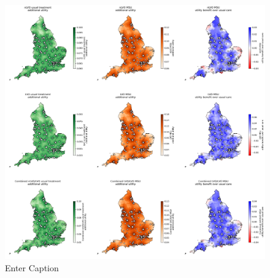 \begin{figure}
    \centering
    \includegraphics[width=1\linewidth]{images/map_utility.jpg}
    \caption{Enter Caption}
    \label{fig:enter-label}
\end{figure}
